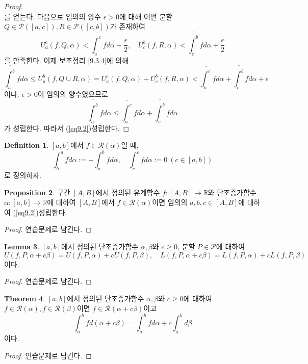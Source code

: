 \documentclass[11pt]{book}
\numberwithin{equation}{chapter}
\def\RR{\mathbb{R}}
\def\eps{\epsilon}
\def\calP{\mathcal{P}}
\def\calR{\mathcal{R}}
\newcommand{\upint}[2]{\overline{\int_{#1}^{#2}}}
\theoremstyle{definition}
\newtheorem{thm}{Theorem}[section]
\newtheorem{lem}[thm]{Lemma}
\newtheorem{prop}[thm]{Proposition}
\newtheorem{defn}[thm]{Definition}
\begin{document}
\begin{proof}
\[    \]
    를 얻는다. 다음으로 임의의 양수 \(\eps > 0\)에 대해 어떤 분할 \(Q \in \calP([a, c]), R \in \calP([c, b])\)가 존재하여
    \[
        U_a^c(f, Q, \alpha) < \upint{a}{c} f d\alpha + \frac{\eps}{2}, \quad U_c^b(f, R, \alpha) < \upint{c}{b} f d\alpha + \frac{\eps}{2}
    \]
    를 만족한다. 이제 보조정리 \ref{9.3.4}에 의해
    \[
        \upint{a}{b} f d\alpha \le U_a^b(f, Q \cup R, \alpha) = U_a^c(f, Q, \alpha) + U_c^b(f, R, \alpha) < \upint{a}{c} f d\alpha + \upint{c}{b} f d\alpha + \eps
    \]
    이다. \(\eps > 0\)이 임의의 양수였으므로
    \[
        \upint{a}{b} f d\alpha \le \upint{a}{c} f d\alpha + \upint{c}{b} f d\alpha
    \]
    가 성립한다. 따라서 (\ref{eq9.2})\가 성립한다.
\end{proof}

\begin{defn}
    \([a, b]\)에서 \(f \in \calR(\alpha)\)일 때,
    \[
        \int_b^a f d\alpha := - \int_a^b f d\alpha, \quad \int_c^c f d\alpha := 0 \ (c \in [a, b])
    \]
    로 정의하자.
\end{defn}

\begin{prop}
    구간 \([A, B]\)에서 정의된 유계함수 \(f : [A, B] \to \RR\)와 단조증가함수 \(\alpha : [a, b] \to \RR\)에 대하여 \([A, B]\)에서 \(f \in \calR(\alpha)\)이면 임의의 \(a, b, c \in [A, B]\)에 대하여 (\ref{eq9.2})\가 성립한다.
\end{prop}
\begin{proof}
    연습문제로 남긴다.
\end{proof}

\begin{lem}
    \([a, b]\)에서 정의된 단조증가함수 \(\alpha, \beta\)와 \(c \ge 0\), 분할 \(P \in \calP\)에 대하여
    \[
        U(f, P, \alpha + c\beta) = U(f, P, \alpha) + cU(f, P, \beta), \quad L(f, P, \alpha + c\beta) = L(f, P, \alpha) + cL(f, P, \beta)
    \]
    이다.
\end{lem}
\begin{proof}
    연습문제로 남긴다.
\end{proof}

\begin{thm} \label{9.3.11}
    \([a, b]\)에서 정의된 단조증가함수 \(\alpha, \beta\)와 \(c \ge 0\)에 대하여 \(f \in \calR(\alpha), f \in \calR(\beta)\)이면 \(f \in \calR(\alpha + c\beta)\)이고
    \[
        \int_a^b f d(\alpha + c\beta) = \int_a^b f d\alpha + c \int_a^b d\beta
    \]
    이다.
\end{thm}
\begin{proof}
    연습문제로 남긴다.
\end{proof}
\end{document}

